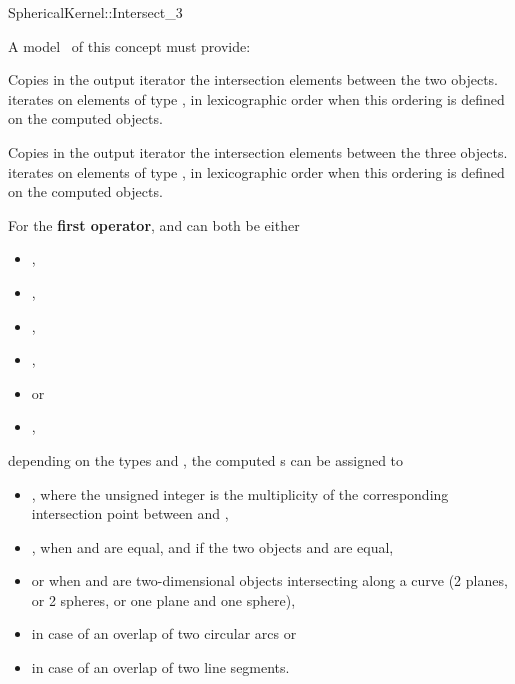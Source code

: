 \begin{ccRefFunctionObjectConcept}{SphericalKernel::Intersect_3}

\ccRefines



A model \ccVar\ of this concept must provide:

{Copies in the output iterator the intersection elements between the
two objects.  iterates on
elements of type , in lexicographic order 
when this ordering is defined on the computed objects.}

{Copies in the output iterator the intersection elements between the
three objects.  iterates on
elements of type , in lexicographic order 
when this ordering is defined on the computed objects.}

For the \textbf{first operator},  and  can both 
be either

\begin{itemize}
\item {} ,
\item {} ,
\item {} ,
\item {} ,
\item {}  or
\item {} ,
\end{itemize} 

depending on the types  and , the computed 
s can be assigned to 
\begin{itemize}
\item {} ,
where the unsigned integer is the multiplicity of the corresponding
intersection point between  and ,
\item {} , when  and  are equal, and 
if the two objects  and  are equal,
\item {}  or  
when  and  are two-dimensional objects intersecting 
along a curve (2 planes, or 2 spheres, or one plane and one sphere),
\item {}  in case of an overlap of 
two circular arcs or
\item {}  in case of an overlap of two 
line segments. 
\end{itemize} 


\end{ccRefFunctionObjectConcept}
